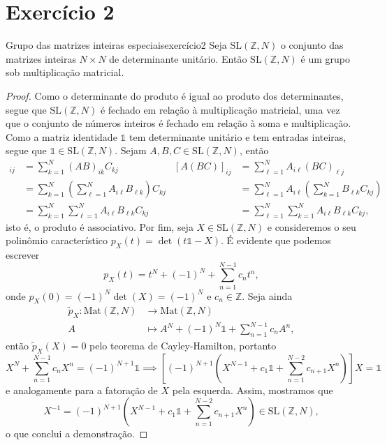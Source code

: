 \section{Exercício 2}
\begin{proposition}{Grupo das matrizes inteiras especiais}{exercício2}
    Seja \(\mathrm{SL}(\mathbb{Z}, N)\) o conjunto das matrizes inteiras \(N \times N\) de determinante unitário. Então \(\mathrm{SL}(\mathbb{Z}, N)\) é um grupo sob multiplicação matricial.
\end{proposition}
\begin{proof}
    Como o determinante do produto é igual ao produto dos determinantes, segue que \(\mathrm{SL}(\mathbb{Z}, N)\) é fechado em relação à multiplicação matricial, uma vez que o conjunto de números inteiros é fechado em relação à soma e multiplicação. Como a matriz identidade \(\mathds{1}\) tem determinante unitário e tem entradas inteiras, segue que \(\mathds{1} \in \mathrm{SL}(\mathbb{Z}, N)\). Sejam \(A, B, C \in \mathrm{SL}(\mathbb{Z}, N)\), então
    \begin{align*}
        [(AB)C]_{ij} &= \sum_{k = 1}^N (AB)_{ik} C_{kj}&
        [A(BC)]_{ij} &= \sum_{\ell = 1}^N A_{i\ell} (BC)_{\ell j}\\
                     &= \sum_{k = 1}^N \left(\sum_{\ell = 1}^N A_{i\ell}B_{\ell k}\right) C_{kj}&
                     &= \sum_{\ell = 1}^N A_{i\ell}\left(\sum_{k = 1}^N B_{\ell k} C_{k j}\right)\\
                     &= \sum_{k = 1}^N \sum_{\ell = 1}^N A_{i\ell} B_{\ell k} C_{kj}&
                     &= \sum_{\ell = 1}^N \sum_{k = 1}^N A_{i\ell} B_{\ell k} C_{k j},
    \end{align*}
    isto é, o produto é associativo. Por fim, seja \(X \in \mathrm{SL}(\mathbb{Z}, N)\) e consideremos o seu polinômio característico \(p_X(t) = \det(t \mathds{1} - X)\). É evidente que podemos escrever
    \begin{equation*}
        p_X(t) = t^N + (-1)^N + \sum_{n=1}^{N-1} c_n t^{n},
    \end{equation*}
    onde \(p_X(0) = (-1)^N\det(X) = (-1)^N\) e \(c_n \in \mathbb{Z}\). Seja ainda
    \begin{align*}
        \tilde{p}_X : \mathrm{Mat}(\mathbb{Z}, N) &\to \mathrm{Mat}(\mathbb{Z}, N)\\
        A &\mapsto A^N + (-1)^N \mathds{1} + \sum_{n=1}^{N-1} c_n A^n,
    \end{align*}
    então \(\tilde{p}_X(X) = 0\) pelo teorema de Cayley-Hamilton, portanto
    \begin{equation*}
        X^N + \sum_{n = 1}^{N-1} c_n X^n = (-1)^{N+1} \mathds{1} \implies \left[(-1)^{N+1} \left(X^{N-1} + c_1 \mathds{1} + \sum_{n=1}^{N-2} c_{n+1} X^{n}\right)\right]X = \mathds{1}
    \end{equation*}
    e analogamente para a fatoração de \(X\) pela esquerda. Assim, mostramos que
    \begin{equation*}
        X^{-1} = (-1)^{N+1} \left(X^{N-1} + c_1 \mathds{1} + \sum_{n=1}^{N-2} c_{n+1} X^{n}\right) \in \mathrm{SL}(\mathbb{Z}, N),
    \end{equation*}
    o que conclui a demonstração.
\end{proof}
